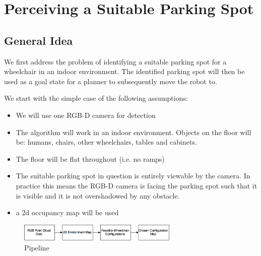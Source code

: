 \chapter{Perceiving a Suitable Parking Spot}


\section{General Idea}
We first address the problem of identifying a suitable parking spot for a
wheelchair in an indoor environment. The identified parking spot will then be
used as a goal state for a planner to subsequently move the robot to.

We start with the simple case of the following assumptions:
\begin{itemize}
\item We will use one RGB-D camera for detection
\item The algorithm will work in an indoor environment. Objects on the floor
will be: humans, chairs, other wheelchairs, tables and cabinets.
\item The floor will be flat throughout (i.e. no ramps)
\item The suitable parking spot in question is entirely viewable by the camera.
In practice this means the RGB-D camera is facing the parking spot such that
it is visible and it is not overshadowed by any obstacle.
\item a 2d occupancy map will be used
\end{itemize}


\begin{figure}
\centering
\includegraphics[width=3in]{figures/rgbdmap.png}
\caption{Pipeline}
\label{fig:rgbdmap}
\end{figure}

